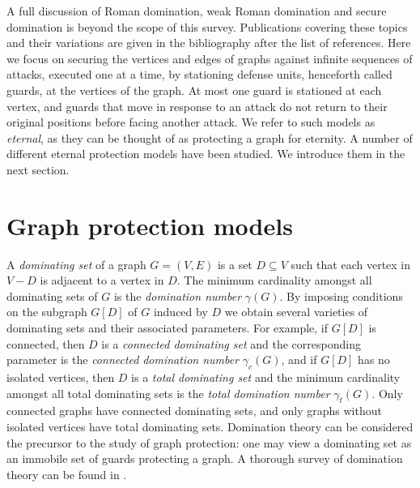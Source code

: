 \documentclass[12pt]{article}%
\begin{document}
A full discussion of Roman domination, weak Roman domination and secure
domination is beyond the scope of this survey. Publications covering these
topics and their variations are given in the bibliography after the list of
references. Here we focus on securing the vertices and edges of graphs against
infinite sequences of attacks, executed one at a time, by stationing defense
units, henceforth called guards, at the vertices of the graph. At most one
guard is stationed at each vertex, and guards that move in response to an
attack do not return to their original positions before facing another attack.
We refer to such models as \emph{eternal}, as they can be thought of as
protecting a graph for eternity. A number of different eternal protection
models have been studied. We introduce them in the next section.

\section{Graph protection models}

\label{Sec_Models}A \emph{dominating set }of a graph $G=(V,E)$ is a set
$D\subseteq V$ such that each vertex in $V-D$ is adjacent to a vertex in $D$.
The minimum cardinality amongst all dominating sets of $G$ is the
\emph{domination number} $\gamma(G)$. By imposing conditions on the subgraph
$G[D]$ of $G$ induced by $D$ we obtain several varieties of dominating sets
and their associated parameters. For example, if $G[D]$ is connected, then $D$
is a \emph{connected dominating set }and the corresponding parameter is the
\emph{connected} \emph{domination number} $\gamma_{c}(G)$, and if $G[D]$ has
no isolated vertices, then $D$ is a \emph{total dominating set }and the
minimum cardinality amongst all total dominating sets is the \emph{total
domination number} $\gamma_{t}(G)$. Only connected graphs have connected
dominating sets, and only graphs without isolated vertices have total
dominating sets. Domination theory can be considered the precursor to the
study of graph protection: one may view a dominating set as an immobile set of
guards protecting a graph. A thorough survey of domination theory can be found
in \cite{HHS}.
\end{document}
